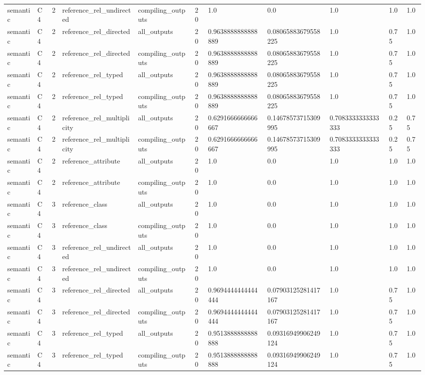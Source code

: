 \begin{tabular}{lllllllllll}
semantic & C4 & 2 & reference\_rel\_undirected & compiling\_outputs & 20 & 1.0 & 0.0 & 1.0 & 1.0 & 1.0 \\
semantic & C4 & 2 & reference\_rel\_directed & all\_outputs & 20 & 0.9638888888888889 & 0.08065883679558225 & 1.0 & 0.75 & 1.0 \\
semantic & C4 & 2 & reference\_rel\_directed & compiling\_outputs & 20 & 0.9638888888888889 & 0.08065883679558225 & 1.0 & 0.75 & 1.0 \\
semantic & C4 & 2 & reference\_rel\_typed & all\_outputs & 20 & 0.9638888888888889 & 0.08065883679558225 & 1.0 & 0.75 & 1.0 \\
semantic & C4 & 2 & reference\_rel\_typed & compiling\_outputs & 20 & 0.9638888888888889 & 0.08065883679558225 & 1.0 & 0.75 & 1.0 \\
semantic & C4 & 2 & reference\_rel\_multiplicity & all\_outputs & 20 & 0.6291666666666667 & 0.14678573715309995 & 0.7083333333333333 & 0.25 & 0.75 \\
semantic & C4 & 2 & reference\_rel\_multiplicity & compiling\_outputs & 20 & 0.6291666666666667 & 0.14678573715309995 & 0.7083333333333333 & 0.25 & 0.75 \\
semantic & C4 & 2 & reference\_attribute & all\_outputs & 20 & 1.0 & 0.0 & 1.0 & 1.0 & 1.0 \\
semantic & C4 & 2 & reference\_attribute & compiling\_outputs & 20 & 1.0 & 0.0 & 1.0 & 1.0 & 1.0 \\
semantic & C4 & 3 & reference\_class & all\_outputs & 20 & 1.0 & 0.0 & 1.0 & 1.0 & 1.0 \\
semantic & C4 & 3 & reference\_class & compiling\_outputs & 20 & 1.0 & 0.0 & 1.0 & 1.0 & 1.0 \\
semantic & C4 & 3 & reference\_rel\_undirected & all\_outputs & 20 & 1.0 & 0.0 & 1.0 & 1.0 & 1.0 \\
semantic & C4 & 3 & reference\_rel\_undirected & compiling\_outputs & 20 & 1.0 & 0.0 & 1.0 & 1.0 & 1.0 \\
semantic & C4 & 3 & reference\_rel\_directed & all\_outputs & 20 & 0.9694444444444444 & 0.07903125281417167 & 1.0 & 0.75 & 1.0 \\
semantic & C4 & 3 & reference\_rel\_directed & compiling\_outputs & 20 & 0.9694444444444444 & 0.07903125281417167 & 1.0 & 0.75 & 1.0 \\
semantic & C4 & 3 & reference\_rel\_typed & all\_outputs & 20 & 0.9513888888888888 & 0.09316949906249124 & 1.0 & 0.75 & 1.0 \\
semantic & C4 & 3 & reference\_rel\_typed & compiling\_outputs & 20 & 0.9513888888888888 & 0.09316949906249124 & 1.0 & 0.75 & 1.0 \\

\end{tabular}
